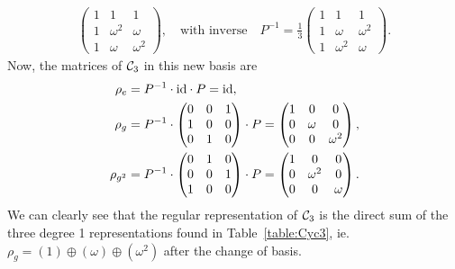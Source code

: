 \begin{example}
\begin{align*}
\begin{pmatrix}
				1&1&1 \\
				1&\omega^2&\omega \\
				1&\omega&\omega^2
			\end{pmatrix}, \quad \text{with inverse} \quad P^{-1} = \frac{1}{3}\begin{pmatrix}
				1&1&1 \\
				1&\omega&\omega^2 \\
				1&\omega^2&\omega
			\end{pmatrix}.
		\end{align*}
		Now, the matrices of $\mathcal{C}_3$ in this new basis are
		\begin{align*}
			\rho_e &= P^{-1} \cdot \text{id} \cdot P = \text{id}, \\ 
			\rho_g &= P^{-1}\cdot\begin{pmatrix}
				0&0&1 \\ 1&0&0 \\ 0&1&0
			\end{pmatrix}\cdot P = \begin{pmatrix}
			1&0&0 \\ 0&\omega&0 \\ 0&0&\omega^2
			\end{pmatrix}, \\
			\rho_{g^2} &= P^{-1}\cdot\begin{pmatrix}
				0&1&0 \\ 0&0&1 \\ 1&0&0 
			\end{pmatrix}\cdot P = \begin{pmatrix}
			1&0&0 \\ 0&\omega^2&0 \\ 0&0&\omega
			\end{pmatrix}.
		\end{align*}
		We can clearly see that the regular representation of $\mathcal{C}_3$ is the direct sum of the three degree 1 representations found in Table~\ref{table:Cyc3}, ie. $\rho_g = (1) \oplus (\omega) \oplus (\omega^2)$ after the change of basis.
	\end{example}
	
